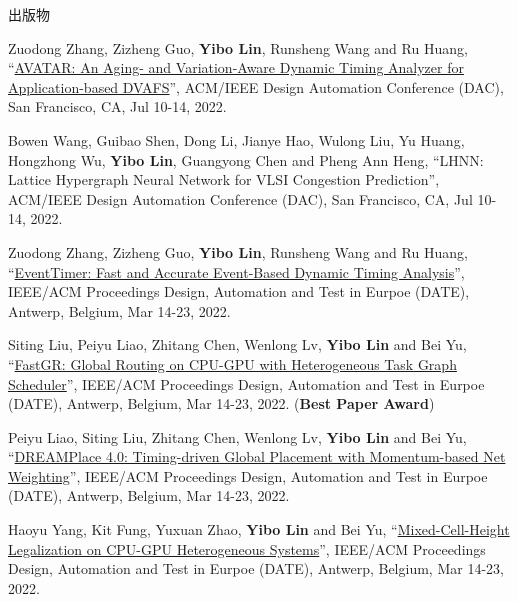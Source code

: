 \begin{rSection}{出版物}
\begin{description}[font=\normalfont, rightmargin=2em]
{}
            

\item[{[C62]}]{
        Zuodong Zhang, Zizheng Guo, \textbf{Yibo Lin}, Runsheng Wang and Ru Huang, 
    ``\href{https://doi.org/10.1145/3489517.3530530}{AVATAR: An Aging- and Variation-Aware Dynamic Timing Analyzer for Application-based DVAFS}'', 
    ACM/IEEE Design Automation Conference (DAC), San Francisco, CA, Jul 10-14, 2022.
    
}
            

\item[{[C61]}]{
        Bowen Wang, Guibao Shen, Dong Li, Jianye Hao, Wulong Liu, Yu Huang, Hongzhong Wu, \textbf{Yibo Lin}, Guangyong Chen and Pheng Ann Heng, 
    ``LHNN: Lattice Hypergraph Neural Network for VLSI Congestion Prediction'', 
    ACM/IEEE Design Automation Conference (DAC), San Francisco, CA, Jul 10-14, 2022.
    
}
            

\item[{[C60]}]{
        Zuodong Zhang, Zizheng Guo, \textbf{Yibo Lin}, Runsheng Wang and Ru Huang, 
    ``\href{https://doi.org/10.23919/DATE54114.2022.9774642}{EventTimer: Fast and Accurate Event-Based Dynamic Timing Analysis}'', 
    IEEE/ACM Proceedings Design, Automation and Test in Eurpoe (DATE), Antwerp, Belgium, Mar 14-23, 2022.
    
}
            

\item[{[C59]}]{
        Siting Liu, Peiyu Liao, Zhitang Chen, Wenlong Lv, \textbf{Yibo Lin} and Bei Yu, 
    ``\href{https://doi.org/10.23919/DATE54114.2022.9774606}{FastGR: Global Routing on CPU-GPU with Heterogeneous Task Graph Scheduler}'', 
    IEEE/ACM Proceedings Design, Automation and Test in Eurpoe (DATE), Antwerp, Belgium, Mar 14-23, 2022.
    (\textbf{Best Paper Award})
}
            

\item[{[C58]}]{
        Peiyu Liao, Siting Liu, Zhitang Chen, Wenlong Lv, \textbf{Yibo Lin} and Bei Yu, 
    ``\href{https://doi.org/10.23919/DATE54114.2022.9774725}{DREAMPlace 4.0: Timing-driven Global Placement with Momentum-based Net Weighting}'', 
    IEEE/ACM Proceedings Design, Automation and Test in Eurpoe (DATE), Antwerp, Belgium, Mar 14-23, 2022.
    
}
            

\item[{[C57]}]{
        Haoyu Yang, Kit Fung, Yuxuan Zhao, \textbf{Yibo Lin} and Bei Yu, 
    ``\href{https://doi.org/10.23919/DATE54114.2022.9774671}{Mixed-Cell-Height Legalization on CPU-GPU Heterogeneous Systems}'', 
    IEEE/ACM Proceedings Design, Automation and Test in Eurpoe (DATE), Antwerp, Belgium, Mar 14-23, 2022.
    
}
\end{description}
\end{rSection}
